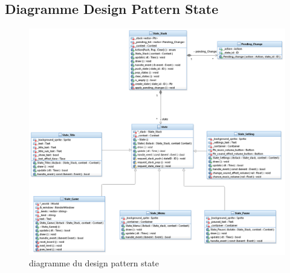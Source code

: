 \newpage
\subsection{Diagramme Design Pattern State}
\begin{figure}[h]
	\centering
	\includegraphics[width=\textwidth] {pictures/state.png}
	\caption{diagramme du design pattern state}
	\label{fig:diagramme_design_pattern_state}
\end{figure}